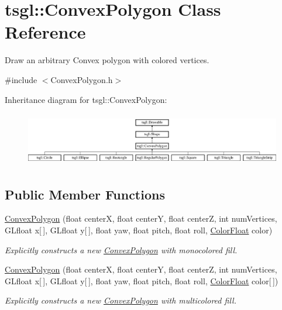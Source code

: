 \hypertarget{classtsgl_1_1_convex_polygon}{}\section{tsgl\+:\+:Convex\+Polygon Class Reference}
\label{classtsgl_1_1_convex_polygon}


Draw an arbitrary Convex polygon with colored vertices.  




{\ttfamily \#include $<$Convex\+Polygon.\+h$>$}

Inheritance diagram for tsgl\+:\+:Convex\+Polygon\+:\begin{figure}[H]
\begin{center}
\leavevmode
\includegraphics[height=2.370370cm]{classtsgl_1_1_convex_polygon}
\end{center}
\end{figure}
\subsection*{Public Member Functions}
\begin{DoxyCompactItemize}
\item 
\hyperlink{classtsgl_1_1_convex_polygon_a4a126a4fd77521f702f8907d7c5cd5df}{Convex\+Polygon} (float centerX, float centerY, float centerZ, int num\+Vertices, G\+Lfloat x\mbox{[}$\,$\mbox{]}, G\+Lfloat y\mbox{[}$\,$\mbox{]}, float yaw, float pitch, float roll, \hyperlink{structtsgl_1_1_color_float}{Color\+Float} color)
\begin{DoxyCompactList}\small\item\em Explicitly constructs a new \hyperlink{classtsgl_1_1_convex_polygon}{Convex\+Polygon} with monocolored fill. \end{DoxyCompactList}\item 
\hyperlink{classtsgl_1_1_convex_polygon_a7985006dd2658733dd693aa30b37ca21}{Convex\+Polygon} (float centerX, float centerY, float centerZ, int num\+Vertices, G\+Lfloat x\mbox{[}$\,$\mbox{]}, G\+Lfloat y\mbox{[}$\,$\mbox{]}, float yaw, float pitch, float roll, \hyperlink{structtsgl_1_1_color_float}{Color\+Float} color\mbox{[}$\,$\mbox{]})
\begin{DoxyCompactList}\small\item\em Explicitly constructs a new \hyperlink{classtsgl_1_1_convex_polygon}{Convex\+Polygon} with multicolored fill. \end{DoxyCompactList}\end{DoxyCompactItemize}
